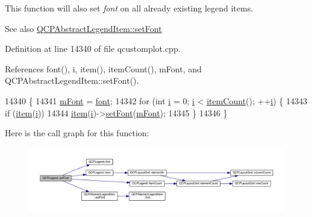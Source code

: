 This function will also set {\itshape font} on all already existing legend items.

\begin{DoxySeeAlso}{See also}
\hyperlink{class_q_c_p_abstract_legend_item_a409c53455d8112f71d70c0c43eb10265}{Q\+C\+P\+Abstract\+Legend\+Item\+::set\+Font} 
\end{DoxySeeAlso}


Definition at line 14340 of file qcustomplot.\+cpp.



References font(), i, item(), item\+Count(), m\+Font, and Q\+C\+P\+Abstract\+Legend\+Item\+::set\+Font().


\begin{DoxyCode}
14340                                          \{
14341   \hyperlink{class_q_c_p_legend_a56ffacb184a99eefe09a0c7181d0713d}{mFont} = \hyperlink{class_q_c_p_legend_a5cf8b840bc02f7bf4edb8dde400d0f41}{font};
14342   \textcolor{keywordflow}{for} (\textcolor{keywordtype}{int} \hyperlink{_comparision_pictures_2_createtest_image_8m_a6f6ccfcf58b31cb6412107d9d5281426}{i} = 0; \hyperlink{_comparision_pictures_2_createtest_image_8m_a6f6ccfcf58b31cb6412107d9d5281426}{i} < \hyperlink{class_q_c_p_legend_a198228e9cdc78d3a3c306fa6763d0404}{itemCount}(); ++\hyperlink{_comparision_pictures_2_createtest_image_8m_a6f6ccfcf58b31cb6412107d9d5281426}{i}) \{
14343     \textcolor{keywordflow}{if} (\hyperlink{class_q_c_p_legend_a454272d7094437beb3278a2294006da5}{item}(\hyperlink{_comparision_pictures_2_createtest_image_8m_a6f6ccfcf58b31cb6412107d9d5281426}{i}))
14344       \hyperlink{class_q_c_p_legend_a454272d7094437beb3278a2294006da5}{item}(\hyperlink{_comparision_pictures_2_createtest_image_8m_a6f6ccfcf58b31cb6412107d9d5281426}{i})->\hyperlink{class_q_c_p_abstract_legend_item_a409c53455d8112f71d70c0c43eb10265}{setFont}(\hyperlink{class_q_c_p_legend_a56ffacb184a99eefe09a0c7181d0713d}{mFont});
14345   \}
14346 \}
\end{DoxyCode}


Here is the call graph for this function\+:\nopagebreak
\begin{figure}[H]
\begin{center}
\leavevmode
\includegraphics[width=350pt]{class_q_c_p_legend_aa4cda8499e3cb0f3be415edc02984c73_cgraph}
\end{center}
\end{figure}


